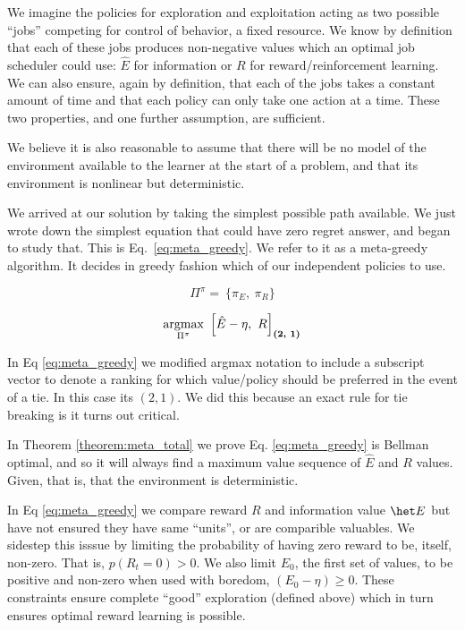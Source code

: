 We imagine the policies for exploration and exploitation acting as two possible ``jobs'' competing for control of behavior, a fixed resource. We know by definition that each of these jobs produces non-negative values which an optimal job scheduler could use: $\hat E$ for information or $R$ for reward/reinforcement learning. We can also ensure, again by definition, that each of the jobs takes a constant amount of time and that each policy can only take one action at a time. These two properties, and one further assumption, are sufficient.

We believe it is also reasonable to assume that there will be no model of the environment available to the learner at the start of a problem, and that its environment is nonlinear but deterministic. 

We arrived at our solution by taking the simplest possible path available. We just wrote down the simplest equation that could have zero regret answer, and began to study that. This is Eq.~\ref{eq:meta_greedy}. We refer to it as a meta-greedy algorithm. It decides in greedy fashion which of our independent policies to use.

\begin{equation}
\label{eq:pipi} 
\Pi^{\pi} = \ \Big \{ \pi_E,\ \pi_R \Big \}
\end{equation}

\begin{equation}
\label{eq:meta_greedy} 
	\operatorname*{argmax}_{\Pi^{\pi}} \ \Big [ \hat E - \eta,\ R \Big ]_{\textbf{(2, 1)}}
\end{equation}
	
In Eq \ref{eq:meta_greedy} we modified argmax notation to include a subscript vector to denote a ranking for which value/policy should be preferred in the event of a tie. In this case its $(2,1)$. We did this because an exact rule for tie breaking is it turns out critical. 

In Theorem \ref{theorem:meta_total} we prove Eq. \ref{eq:meta_greedy} is Bellman optimal, and so it will always find a maximum value sequence of $\hat E$ and $R$ values. Given, that is, that the environment is deterministic. 


In Eq \ref{eq:meta_greedy} we compare reward $R$ and information value $\het E$ but have not ensured they have same ``units'', or are comparible valuables. We sidestep this isssue by limiting the probability of having zero reward to be, itself, non-zero. That is, $p(R_t=0) > 0$. We also limit $E_0$, the first set of values, to be positive and non-zero when used with boredom, $(E_0 - \eta) \geq 0$. These constraints ensure complete ``good'' exploration (defined above) which in turn ensures optimal reward learning is possible.

